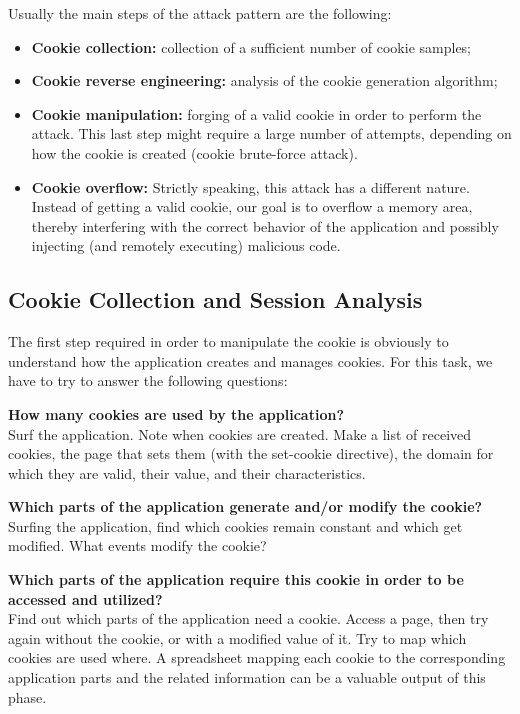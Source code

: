 		Usually the main steps of the attack pattern are the following:
			\begin{itemize}
				\item {\bf Cookie collection:} collection of a sufficient number of cookie samples;
				\item {\bf Cookie reverse engineering:} analysis of the cookie generation algorithm;
				\item {\bf Cookie manipulation:} forging of a valid cookie in order to perform the 
				attack. This last step might require a large number of attempts, depending on how the 
				cookie is created (cookie brute-force attack).
				\item {\bf Cookie overflow:} Strictly speaking, this attack has a different nature. Instead 
				of getting a valid cookie, our goal is to overflow a memory area, thereby interfering
				with the correct behavior of the application and possibly injecting (and remotely 
				executing) malicious code.
			\end{itemize}

		\subsection{Cookie Collection and Session Analysis}

			The first step required in order to manipulate the cookie is obviously to understand how 
			the application creates and manages cookies. For this task, we have to try to answer the
			following questions: 

			{\bf How many cookies are used by the application?} \\
			Surf the application. Note when cookies are created. Make a list of received cookies, 
			the page that sets them (with the set-cookie directive), the domain for which they are 
			valid, their value, and their characteristics.

			{\bf Which parts of the application generate and/or modify the cookie?} \\
			Surfing the application, find which cookies remain constant and which get modified. 
			What events modify the cookie?

			{\bf Which parts of the application require this cookie in order to be accessed and utilized?} \\
			Find out which parts of the application need a cookie. Access a page, then try again without 
			the cookie, or with a modified value of it. Try to map which cookies are used where.
			A spreadsheet mapping each cookie to the corresponding application parts and the related 
			information can be a valuable output of this phase.

